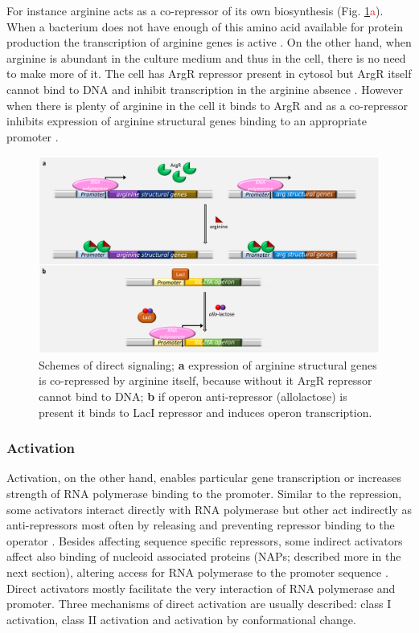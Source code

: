 For instance arginine acts as a co-repressor of its own biosynthesis (Fig. \ref{dir}\textcolor{red}{a}).
When a bacterium does not have enough of this amino acid available for protein production the transcription of arginine genes is active \cite{charlier2004biosynthesis, caldara2006arginine}.
On the other hand, when arginine is abundant in the culture medium and thus in the cell, there is no need to make more of it.
The cell has ArgR repressor present in cytosol but ArgR itself cannot bind to DNA and inhibit transcription in the arginine absence \cite{clark2005molecular, caldara2006arginine}.
However when there is plenty of arginine in the cell it binds to ArgR and as a co-repressor inhibits expression of arginine structural genes binding to an appropriate promoter \cite{charlier1992arginine, charlier2004biosynthesis, clark2005molecular}.

\begin{figure}[ht]
  \centering
  \includegraphics[scale=0.27]{text/Pictures/DirectSignaling.png}
	\caption{Schemes of direct signaling; \textbf{a} expression of arginine structural genes is co-repressed by arginine itself, because without it ArgR repressor cannot bind to DNA; \textbf{b} if  operon anti-repressor (allolactose) is present it binds to LacI repressor and induces  operon transcription.}
	\label{dir}
\end{figure}

\subsubsection{Activation}
Activation, on the other hand, enables particular gene transcription or increases strength of RNA polymerase binding to the promoter.
Similar to the repression, some activators interact directly with RNA polymerase but other act indirectly as anti-repressors most often by releasing and preventing repressor binding to the operator \cite{frederix2011co}.
Besides affecting sequence specific repressors, some indirect activators affect also binding of nucleoid associated proteins (NAPs; described more in the next section), altering access for RNA polymerase to the promoter sequence \cite{santana2001transcriptional}.
Direct activators mostly facilitate the very interaction of RNA polymerase and promoter.
Three mechanisms of direct activation are usually described: class I activation, class II activation and activation by conformational change.

